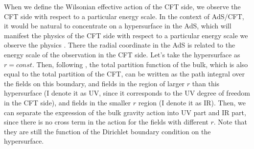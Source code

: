 \documentclass[12pt,epsbox]{article}
\numberwithin{equation}{section}
\begin{document}
When we define the Wilsonian effective action of the CFT side, we observe the CFT side with respect to a particular energy scale. In the context of AdS/CFT, it would be natural to concentrate on a hypersurface in the AdS, which will manifest the physics of the CFT side with respect to a particular energy scale we observe the physics \cite{dVV}. There the radial coordinate in the AdS is related to the energy scale of the observation in the CFT side. %
Let's take the hypersurface as $r=const$. Then, following \cite{Polchinski}, the total partition function of the bulk, which is also equal to the total partition of the CFT, can be written as the path integral over the fields on this boundary, and fields in the region of larger $r$ than this hypersurface (I denote it as UV, since it corresponds to the UV degree of freedom in the CFT side), and fields in the smaller $r$ region (I denote it as IR). Then, we can separate the expression of the bulk gravity action into UV part and IR part, since there is no cross term in the action for the fields with different $r$. Note that they are still the function of the Dirichlet boundary condition on the hypersurface.
\end{document}

